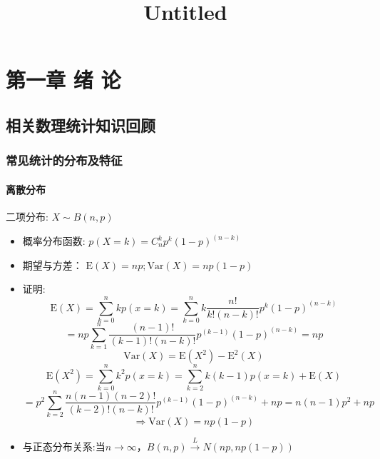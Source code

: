 \documentclass[
  ignorenonframetext,
]{beamer}
\title{Untitled}
\author{}
\date{}
\begin{document}
\frame{\titlepage}
\ifdefined\Shaded\renewenvironment{Shaded}{\begin{tcolorbox}[interior hidden, frame hidden, enhanced, breakable, borderline west={3pt}{0pt}{shadecolor}, sharp corners, boxrule=0pt]}{\end{tcolorbox}}\fi

\hypertarget{ux7b2cux4e00ux7ae0-ux7eea-ux8bba}{%
\section{第一章 绪 论}\label{ux7b2cux4e00ux7ae0-ux7eea-ux8bba}}

\hypertarget{ux76f8ux5173ux6570ux7406ux7edfux8ba1ux77e5ux8bc6ux56deux987e}{%
\subsection{相关数理统计知识回顾}\label{ux76f8ux5173ux6570ux7406ux7edfux8ba1ux77e5ux8bc6ux56deux987e}}

\hypertarget{ux5e38ux89c1ux7edfux8ba1ux7684ux5206ux5e03ux53caux7279ux5f81}{%
\subsubsection{常见统计的分布及特征}\label{ux5e38ux89c1ux7edfux8ba1ux7684ux5206ux5e03ux53caux7279ux5f81}}

\hypertarget{ux79bbux6563ux5206ux5e03}{%
\paragraph{离散分布}\label{ux79bbux6563ux5206ux5e03}}

\begin{frame}{二项分布: \(X\sim B(n,p)\)}
\protect\hypertarget{ux4e8cux9879ux5206ux5e03-xsim-bnp}{}
\begin{itemize}
\item
  概率分布函数: \(p(X=k)=C^k_np^k(1-p)^{(n-k)}\)
\item
  期望与方差： \(\mathrm E(X)=np;\mathrm{Var}(X)=np(1-p)\)
\item
  证明:
  \[\mathrm E(X)=\sum\limits^{n}_{k=0}kp(x=k)=\sum\limits^{n}_{k=0}k\frac{n!}{k!(n-k)!}p^k(1-p)^{(n-k)}\]
  \[=np\sum\limits^{n}_{k=1}\frac{(n-1)!}{(k-1)!(n-k)!}p^{(k-1)}(1-p)^{(n-k)}=np \]
  \[\mathrm {Var}(X)=\mathrm {E}(X^2)-\mathrm {E}^2(X) \]
  \[\mathrm {E}(X^2)=\sum\limits^{n}_{k=0}k^2p(x=k)=\sum\limits^{n}_{k=2}k(k-1)p(x=k)+\mathrm E(X)\]
  \[ =p^2\sum\limits^{n}_{k=2}\frac{n(n-1)(n-2)!}{(k-2)!(n-k)!}p^{(k-1)}(1-p)^{(n-k)}+np=n(n-1)p^2+np\]
  \[\Rightarrow \mathrm{Var}(X)=np(1-p)\]
\item
  与正态分布关系:当\(n\rightarrow \infty， B(n,p)\overset{L}{\rightarrow}N(np,np(1-p))\)
\end{itemize}
\end{frame}
\end{document}
